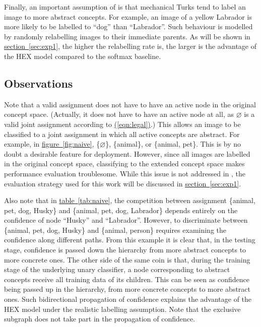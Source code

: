 \documentclass[11pt,a4paper]{article}
\begin{document}
Finally, an important assumption of \cite{deng2014large} is that mechanical Turks tend to label an image to more abstract concepts. For example, an image of a yellow Labrador is more likely to be labelled to ``dog'' than ``Labrador''. Such behaviour is modelled by randomly relabelling images to their immediate parents. As will be shown in \hyperref[sec:exp1]{section~\ref{sec:exp1}}, the higher the relabelling rate is, the larger is the advantage of the HEX model compared to the softmax baseline.

\subsection{Observations}
\label{sec:observ}

Note that a valid assignment does not have to have an active node in the original concept space. (Actually, it does not have to have an active node at all, as $\varnothing$ is a valid joint assignment according to \hyperref[eqn:legal]{(\ref{eqn:legal})}.) This allows an image to be classified to a joint assignment in which all active concepts are abstract. For example, in \hyperref[fig:naive]{figure~\ref{fig:naive}}, \{$\varnothing$\}, \{animal\}, or \{animal, pet\}. This is by no doubt a desirable feature for deployment. However, since all images are labelled in the original concept space, classifying to the extended concept space makes performance evaluation troublesome. While this issue is not addressed in \cite{deng2014large}, the evaluation strategy used for this work will be discussed in \hyperref[sec:exp1]{section~\ref{sec:exp1}}.

Also note that in \hyperref[tab:naive]{table~\ref{tab:naive}}, the competition between assignment \{animal, pet, dog, Husky\} and \{animal, pet, dog, Labrador\} depends entirely on the confidence of node ``Husky'' and ``Labrador''. However, to discriminate between \{animal, pet, dog, Husky\} and \{animal, person\} requires examining the confidence along different paths. From this example it is clear that, in the testing stage, confidence is passed down the hierarchy from more abstract concepts to more concrete ones. The other side of the same coin is that, during the training stage of the underlying unary classifier, a node corresponding to abstract concepts receive all training data of its children. This can be seen as confidence being passed up in the hierarchy, from more concrete concepts to more abstract ones. Such bidirectional propagation of confidence explains the advantage of the HEX model under the realistic labelling assumption. Note that the exclusive subgraph does not take part in the propagation of confidence.
\end{document}
